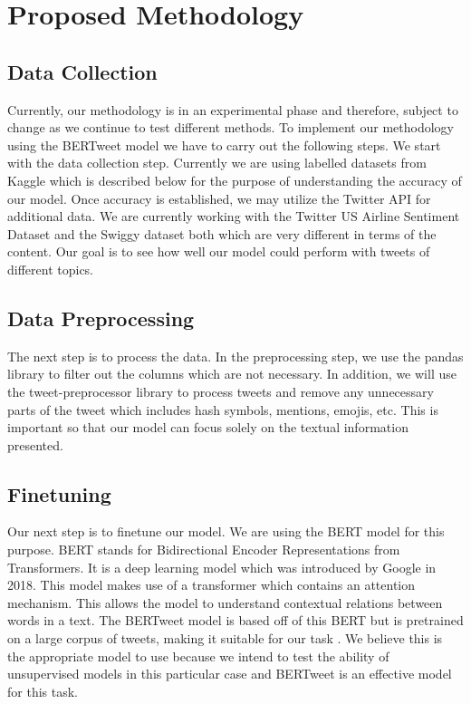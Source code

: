 \documentclass[conference]{IEEEtran}
\begin{document}
\section{Proposed Methodology}
\subsection{Data Collection}
Currently, our methodology is in an experimental phase and therefore, subject to change as we continue to test different methods. 
To implement our methodology using the BERTweet model we have to carry out the following steps. 
We start with the data collection step. 
Currently we are using labelled datasets from Kaggle which is described below for the purpose of understanding the accuracy of our model. 
Once accuracy is established, we may utilize the Twitter API for additional data. 
We are currently working with the Twitter US Airline Sentiment Dataset and the Swiggy dataset both which are very different in terms of the content. 
Our goal is to see how well our model could perform with tweets of different topics. 

\subsection{Data Preprocessing}
The next step is to process the data. 
In the preprocessing step, we use the pandas library to filter out the columns which are not necessary.  
In addition, we will use the tweet-preprocessor library to process tweets and remove any unnecessary parts of the tweet which includes hash symbols, mentions, emojis, etc. 
This is important so that our model can focus solely on the textual information presented. 

\subsection{Finetuning}
Our next step is to finetune our model. 
We are using the BERT model for this purpose. 
BERT stands for Bidirectional Encoder Representations from Transformers. 
It is a deep learning model which was introduced by Google in 2018. 
This model makes use of a transformer which contains an attention mechanism. 
This allows the model to understand contextual relations between words in a text\cite{b17}.
The BERTweet model is based off of this BERT but is pretrained on a large corpus of tweets, making it suitable for our task  \cite{b18}.
We believe this is the appropriate model to use because we intend to test the ability of unsupervised models in this particular case and BERTweet is an effective model for this task.
\end{document}

